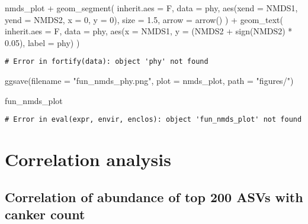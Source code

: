\documentclass[
]{article}
\newenvironment{Shaded}{\begin{snugshade}}{\end{snugshade}}
\newcommand{\AttributeTok}[1]{\textcolor[rgb]{0.77,0.63,0.00}{#1}}
\newcommand{\DecValTok}[1]{\textcolor[rgb]{0.00,0.00,0.81}{#1}}
\newcommand{\FloatTok}[1]{\textcolor[rgb]{0.00,0.00,0.81}{#1}}
\newcommand{\FunctionTok}[1]{\textcolor[rgb]{0.00,0.00,0.00}{#1}}
\newcommand{\NormalTok}[1]{#1}
\newcommand{\SpecialCharTok}[1]{\textcolor[rgb]{0.00,0.00,0.00}{#1}}
\newcommand{\StringTok}[1]{\textcolor[rgb]{0.31,0.60,0.02}{#1}}
\begin{document}
\begin{Shaded}
\begin{Highlighting}[]
\NormalTok{nmds\_plot }\SpecialCharTok{+} \FunctionTok{geom\_segment}\NormalTok{(}
  \AttributeTok{inherit.aes =}\NormalTok{ F, }\AttributeTok{data =}\NormalTok{ phy, }
  \FunctionTok{aes}\NormalTok{(}\AttributeTok{xend =}\NormalTok{ NMDS1, }\AttributeTok{yend =}\NormalTok{ NMDS2, }\AttributeTok{x =} \DecValTok{0}\NormalTok{, }\AttributeTok{y =} \DecValTok{0}\NormalTok{), }
  \AttributeTok{size =} \FloatTok{1.5}\NormalTok{, }\AttributeTok{arrow =} \FunctionTok{arrow}\NormalTok{()}
\NormalTok{) }\SpecialCharTok{+} 
  \FunctionTok{geom\_text}\NormalTok{(}
    \AttributeTok{inherit.aes =}\NormalTok{ F, }\AttributeTok{data =}\NormalTok{ phy, }
    \FunctionTok{aes}\NormalTok{(}\AttributeTok{x =}\NormalTok{ NMDS1, }\AttributeTok{y =}\NormalTok{ (NMDS2 }\SpecialCharTok{+} \FunctionTok{sign}\NormalTok{(NMDS2) }\SpecialCharTok{*} \FloatTok{0.05}\NormalTok{), }\AttributeTok{label =}\NormalTok{ phy)}
\NormalTok{  )}
\end{Highlighting}
\end{Shaded}

\begin{verbatim}
# Error in fortify(data): object 'phy' not found
\end{verbatim}

\begin{Shaded}
\begin{Highlighting}[]
\FunctionTok{ggsave}\NormalTok{(}\AttributeTok{filename =} \StringTok{"fun\_nmds\_phy.png"}\NormalTok{, }\AttributeTok{plot =}\NormalTok{ nmds\_plot, }\AttributeTok{path =} \StringTok{"figures/"}\NormalTok{)}

\NormalTok{fun\_nmds\_plot}
\end{Highlighting}
\end{Shaded}

\begin{verbatim}
# Error in eval(expr, envir, enclos): object 'fun_nmds_plot' not found
\end{verbatim}

\hypertarget{correlation-analysis}{%
\section{Correlation analysis}\label{correlation-analysis}}

\hypertarget{correlation-of-abundance-of-top-200-asvs-with-canker-count}{%
\subsection{Correlation of abundance of top 200 ASVs with canker
count}\label{correlation-of-abundance-of-top-200-asvs-with-canker-count}}
\end{document}

